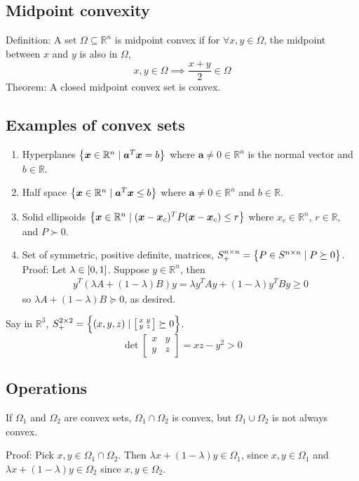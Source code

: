 \documentclass{article}
\newcommand{\m}[1]{\begin{bmatrix} #1 \end{bmatrix}}
\newcommand{\sm}[1]{\left[\begin{smallmatrix} #1 \end{smallmatrix}\right]}
\newcommand{\RR}{\mathbb{R}}
\begin{document}
\subsection{Midpoint convexity}
Definition: A set \(\Omega \subseteq \RR^n\) is midpoint convex if for \(\forall x, y \in \Omega\), the midpoint between \(x\) and \(y\) is also in \(\Omega\),
\[x, y \in \Omega \implies \frac{x + y}{2} \in \Omega\]
Theorem: A closed midpoint convex set is convex.

\subsection{Examples of convex sets}
\begin{enumerate}
\item Hyperplanes \(\set{\bm x \in \RR^n \mid \bm a^T\bm x = b}\) where \(\bm a \neq 0\in \RR^n\) is the normal vector and \(b \in \RR\).
\item Half space \(\set{\bm x \in \RR^n \mid \bm a^T\bm x \leq b}\) where \(\bm a \neq 0 \in \RR^n\) and \(b \in \RR\).
\item Solid ellipsoids \(\set{\bm x \in \RR^n \mid (\bm x - \bm x_c)^TP(\bm x-\bm x_c) \leq r}\) where \(x_c \in \RR^n\), \(r \in \RR\), and \(P \succ 0\).

\item Set of symmetric, positive definite, matrices, \(S^{n \times n}_+ = \set{P \in S^{n \times n} \mid P \succeq 0}\).
  Proof: Let \(\lambda \in \intcc{0, 1}\).
  Suppose \(y \in \RR^n\), then
  \begin{align*}
    y^T(\lambda A + (1-\lambda)B)y = \lambda y^T Ay + (1-\lambda)y^TBy \geq 0
  \end{align*}
  so \(\lambda A + (1-\lambda)B \succeq 0\), as desired.

\end{enumerate}

Say in \(\RR^3\), \(S^{2 \times 2}_+ = \set{(x, y, z) \mid \sm{x & y\\ y & z} \succeq 0}\).
\[\det \m{x & y\\ y & z} = xz - y^2 > 0\]

\subsection{Operations}
If \(\Omega_1\) and \(\Omega_2\) are convex sets, \(\Omega_1 \cap \Omega_2\) is convex, but \(\Omega_1 \cup \Omega_2\) is not always convex.

Proof: Pick \(x, y \in \Omega_1 \cap \Omega_2\).
Then \(\lambda x + (1-\lambda)y \in \Omega_1\), since \(x, y \in \Omega_1\) and \(\lambda x + (1-\lambda)y \in \Omega_2\) since \(x, y \in \Omega_2\).
\end{document}
